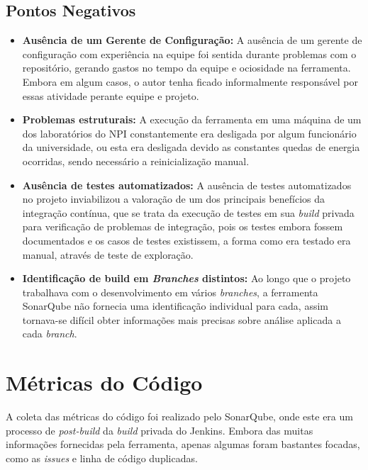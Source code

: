 \subsection{Pontos Negativos}

\begin{itemize}
\item \textbf{Ausência de um Gerente de Configuração:}
A ausência de um gerente de configuração com experiência na equipe foi sentida durante problemas com o repositório, gerando gastos no tempo da equipe e ociosidade na ferramenta. Embora em algum casos, o autor tenha ficado informalmente responsável por essas atividade perante equipe e projeto.

\item \textbf{Problemas estruturais:}
A execução da ferramenta em uma máquina de um dos laboratórios do NPI constantemente era desligada por algum funcionário da universidade, ou esta era desligada devido as constantes quedas de energia ocorridas, sendo necessário a reinicialização manual.

\item \textbf{Ausência de testes automatizados:}
A ausência de testes automatizados no projeto inviabilizou a valoração de um dos principais benefícios da integração contínua, que se trata da execução de testes em sua \textit{build} privada para verificação de problemas de integração, pois os testes embora fossem documentados e os casos de testes existissem, a forma como era testado era manual, através de teste de exploração.

\item \textbf{Identificação de build em \textit{Branches} distintos:} Ao longo que o projeto trabalhava com o desenvolvimento em vários \textit{branches}, a ferramenta SonarQube não fornecia uma identificação individual para cada, assim tornava-se difícil obter informações mais precisas sobre análise aplicada a cada \textit{branch}.
\end{itemize}

\section{Métricas do Código}
A coleta das métricas do código foi realizado pelo SonarQube, onde este era um processo de \textit{post-build} da \textit{build} privada do Jenkins. Embora das muitas informações fornecidas pela ferramenta, apenas algumas foram bastantes focadas, como as \textit{issues} e linha de código duplicadas.

